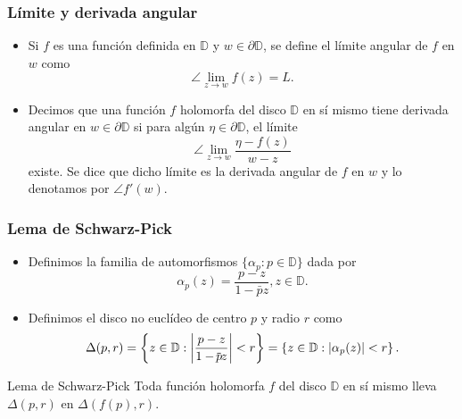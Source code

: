 \documentclass[spanish, a4paper, 12pt, final, slideColor, nototal, colorBG, pdf, noaccumulate, darkblue]{beamer}
\providecommand{\abs}[1]{\left\lvert#1\right\rvert}
\newcommand*\xbar[1]{%
   \hbox{%
     \vbox{%
       \hrule height 0.5pt %
       \kern0.2ex%
       \hbox{%
         \kern-0.1em%
         \ensuremath{#1}%
         \kern-0.1em%
       }%
     }%
   }%
}
\newcommand{\disk}{\mathbb{D}}
\begin{document}
\begin{frame}
    \frametitle{Límite y derivada angular}
    \begin{itemize}
        \item Si $f$ es una función definida en $\disk$ y $w \in \partial \disk$, se define el límite angular de $f$ en $w$ como
            \begin{equation*}
                \angle \lim_{z \to w} f(z) = L.
            \end{equation*}

        \item Decimos que una función $f$ holomorfa del disco $\disk$ en sí mismo tiene derivada angular en $w \in \partial \disk$ si para algún $\eta \in \partial \disk$, el límite
            \begin{equation*}
                \angle \lim_{z \to w} \frac{\eta - f(z)}{w - z}
            \end{equation*}
            existe. Se dice que dicho límite es la derivada angular de $f$ en $w$ y lo denotamos por $\angle f'(w)$.
    \end{itemize}
\end{frame}

\begin{frame}
    \frametitle{Lema de Schwarz-Pick}
    \begin{itemize}
        \item Definimos la familia de automorfismos $\{\alpha_p: p\in \disk\}$ dada por
            \begin{equation*}
                \alpha_p (z) = \frac{p-z}{1 - \bar{p}z}, z \in \disk.
            \end{equation*}

        \item Definimos el disco no euclídeo de centro $p$ y radio $r$ como
            \begin{equation*}
                \Delta(p,r) = \left\{z \in \disk: \abs{\frac{p-z}{1 - \xbar{p}z}} < r\right\} = \left\{z \in \disk: \abs{\alpha_p(z)} < r \right\}.
            \end{equation*}

    \end{itemize}

    \begin{block}{Lema de Schwarz-Pick}
        Toda función holomorfa $f$ del disco $\disk$ en sí mismo lleva $\Delta(p,r)$ en $\Delta(f(p),r)$.
    \end{block}
\end{frame}
\end{document}
